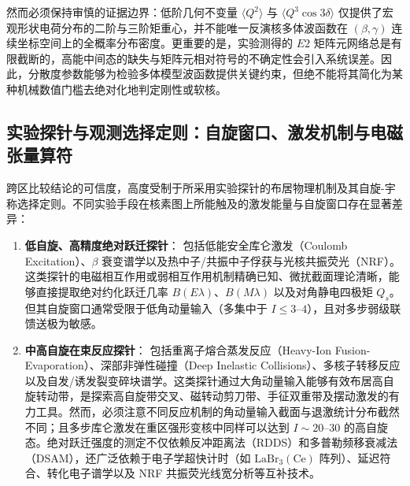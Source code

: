 然而必须保持审慎的证据边界：低阶几何不变量 $\langle Q^2 \rangle$ 与 $\langle Q^3 \cos 3\delta \rangle$ 仅提供了宏观形状电荷分布的二阶与三阶矩重心，并不能唯一反演核多体波函数在 $(\beta,\gamma)$ 连续坐标空间上的全概率分布密度。更重要的是，实验测得的 $E2$ 矩阵元网络总是有限截断的，高能中间态的缺失与矩阵元相对符号的不确定性会引入系统误差。因此，分散度参数能够为检验多体模型波函数提供关键约束，但绝不能将其简化为某种机械数值门槛去绝对化地判定刚性或软核。

\subsection{实验探针与观测选择定则：自旋窗口、激发机制与电磁张量算符}\label{sec:4-1-4}

跨区比较结论的可信度，高度受制于所采用实验探针的布居物理机制及其自旋-宇称选择定则。不同实验手段在核素图上所能触及的激发能量与自旋窗口存在显著差异：
\begin{enumerate}
\item \textbf{低自旋、高精度绝对跃迁探针}：
   包括低能安全库仑激发（Coulomb Excitation）、$\beta$ 衰变谱学以及热中子/共振中子俘获与光核共振荧光（NRF）。这类探针的电磁相互作用或弱相互作用机制精确已知、微扰截面理论清晰，能够直接提取绝对约化跃迁几率 $B(E\lambda)$、$B(M\lambda)$ 以及对角静电四极矩 $Q_s$。但其自旋窗口通常受限于低角动量输入（多集中于 $I \le 3\text{--}4$），且对多步弱级联馈送极为敏感。
\item \textbf{中高自旋在束反应探针}：
   包括重离子熔合蒸发反应（Heavy-Ion Fusion-Evaporation）、深部非弹性碰撞（Deep Inelastic Collisions）、多核子转移反应以及自发/诱发裂变碎块谱学。这类探针通过大角动量输入能够有效布居高自旋转动带，是探索高自旋带交叉、磁转动剪刀带、手征双重带及摆动激发的有力工具。然而，必须注意不同反应机制的角动量输入截面与退激统计分布截然不同；且多步库仑激发在重区强形变核中同样可以达到 $I \sim 20\text{--}30$ 的高自旋态。绝对跃迁强度的测定不仅依赖反冲距离法（RDDS）和多普勒频移衰减法（DSAM），还广泛依赖于电子学超快计时（如 $\mathrm{LaBr}_3(\mathrm{Ce})$ 阵列）、延迟符合、转化电子谱学以及 NRF 共振荧光线宽分析等互补技术。
\end{enumerate}

